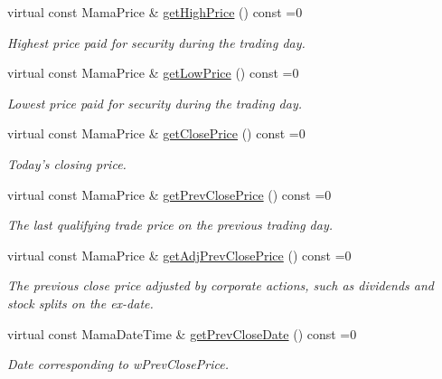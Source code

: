 \begin{CompactItemize}
virtual const Mama\-Price \& \hyperlink{classWombat_1_1MamdaTradeRecap_2ae346c9697a98d723110ae092742a53}{get\-High\-Price} () const =0
\begin{CompactList}\small\item\em Highest price paid for security during the trading day. \item\end{CompactList}\item 
virtual const Mama\-Price \& \hyperlink{classWombat_1_1MamdaTradeRecap_ecd5be58d9917221102b8d35102f2ff7}{get\-Low\-Price} () const =0
\begin{CompactList}\small\item\em Lowest price paid for security during the trading day. \item\end{CompactList}\item 
virtual const Mama\-Price \& \hyperlink{classWombat_1_1MamdaTradeRecap_3a566a9b8bc9a4d2ac34eec055b91a92}{get\-Close\-Price} () const =0
\begin{CompactList}\small\item\em Today's closing price. \item\end{CompactList}\item 
virtual const Mama\-Price \& \hyperlink{classWombat_1_1MamdaTradeRecap_a612fcb5d25ec608317992115fd05349}{get\-Prev\-Close\-Price} () const =0
\begin{CompactList}\small\item\em The last qualifying trade price on the previous trading day. \item\end{CompactList}\item 
virtual const Mama\-Price \& \hyperlink{classWombat_1_1MamdaTradeRecap_6b50a84a3848169713d4110fc6ac1280}{get\-Adj\-Prev\-Close\-Price} () const =0
\begin{CompactList}\small\item\em The previous close price adjusted by corporate actions, such as dividends and stock splits on the ex-date. \item\end{CompactList}\item 
virtual const Mama\-Date\-Time \& \hyperlink{classWombat_1_1MamdaTradeRecap_cbe424a55e6fd1e9cd086b9884b7a6fc}{get\-Prev\-Close\-Date} () const =0
\begin{CompactList}\small\item\em Date corresponding to w\-Prev\-Close\-Price. \item\end{CompactList}\item 

\end{CompactItemize}
